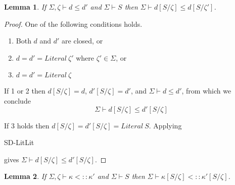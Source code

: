 \documentclass{article}
\newtheorem{lemma}{Lemma}
\begin{document}
\begin{lemma}
If $\Sigma,\zeta \vdash d \leq d'$ and $\Sigma \vdash S$ then $\Sigma \vdash d[S/\zeta] \leq d[S/\zeta']$.
\label{SD-Subst}
\end{lemma}

\begin{proof}
One of the following conditions holds. 
\begin{enumerate}
\item Both $d$ and $d'$ are closed, or
\item $d = d' = \mathit{Literal}~\zeta'$ where $\zeta' \in \Sigma$, or
\item $d = d' = \mathit{Literal}~\zeta$
\end{enumerate}

If 1 or 2 then $d[S/\zeta] = d$, $d'[S/\zeta] = d'$, and $\Sigma \vdash d \leq d'$, from which we conclude 
$$\Sigma \vdash d[S/\zeta] \leq d'[S/\zeta]$$

If 3 holds then $d[S/\zeta] = d'[S/\zeta] = \mathit{Literal}~S$. Applying \begin{sc}SD-LitLit\end{sc} gives
$\Sigma \vdash d[S/\zeta] \leq d'[S/\zeta]$. 
\end{proof}

\begin{lemma}
If $\Sigma,\zeta \vdash \kappa <:: \kappa'$ and $\Sigma \vdash S$ then $\Sigma \vdash \kappa[S/\zeta] <:: \kappa'[S/\zeta]$.
\label{SK-Subst}
\end{lemma}
\end{document}
